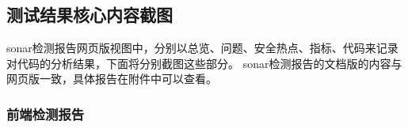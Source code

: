 \documentclass[hyperref, a4paper]{ctexart}
\begin{document}
\hypertarget{ux6d4bux8bd5ux7ed3ux679cux6838ux5fc3ux5185ux5bb9ux622aux56fe}{%
\subsection{测试结果核心内容截图}\label{ux6d4bux8bd5ux7ed3ux679cux6838ux5fc3ux5185ux5bb9ux622aux56fe}}

sonar检测报告网页版视图中，分别以总览、问题、安全热点、指标、代码来记录对代码的分析结果，下面将分别截图这些部分。
sonar检测报告的文档版的内容与网页版一致，具体报告在附件中可以查看。

\hypertarget{ux524dux7aefux68c0ux6d4bux62a5ux544a}{%
\subsubsection{前端检测报告}\label{ux524dux7aefux68c0ux6d4bux62a5ux544a}}
\end{document}
